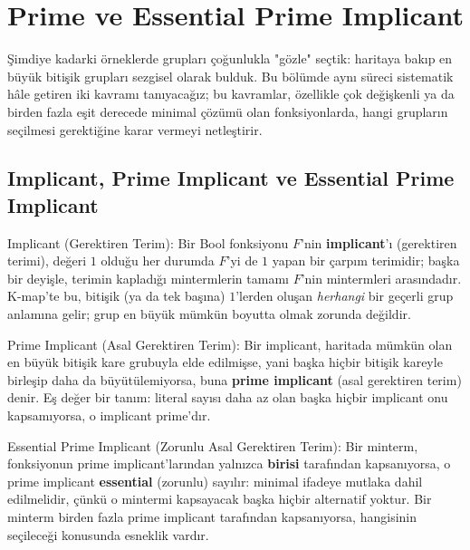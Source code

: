 \section{Prime ve Essential Prime Implicant}\label{sec:kmap-prime-implicant}
Şimdiye kadarki örneklerde grupları çoğunlukla "gözle" seçtik: haritaya bakıp en büyük
bitişik grupları sezgisel olarak bulduk. Bu bölümde aynı süreci sistematik hâle getiren
iki kavramı tanıyacağız; bu kavramlar, özellikle çok değişkenli ya da birden fazla eşit
derecede minimal çözümü olan fonksiyonlarda, hangi grupların seçilmesi gerektiğine karar
vermeyi netleştirir.

\subsection{Implicant, Prime Implicant ve Essential Prime Implicant}\label{sec:prime-implicant-tanimlar}

\begin{tanim}{Implicant (Gerektiren Terim):}
Bir Bool fonksiyonu $F$'nin \textbf{implicant}'ı (gerektiren terimi),
değeri $1$ olduğu her
durumda $F$'yi de $1$ yapan bir çarpım terimidir; başka bir deyişle, terimin kapladığı
mintermlerin tamamı $F$'nin mintermleri arasındadır. K-map'te bu, bitişik (ya da tek
başına) $1$'lerden oluşan \emph{herhangi} bir geçerli grup anlamına gelir; grup en büyük
mümkün boyutta olmak zorunda değildir.
\end{tanim}

\begin{tanim}{Prime Implicant (Asal Gerektiren Terim):}
Bir implicant, haritada mümkün olan en büyük bitişik kare grubuyla elde edilmişse, yani
başka hiçbir bitişik kareyle birleşip daha da büyütülemiyorsa, buna \textbf{prime
implicant} (asal gerektiren terim) denir. Eş değer bir tanım:
literal sayısı daha az olan
başka hiçbir implicant onu kapsamıyorsa, o implicant prime'dır.
\end{tanim}

\begin{tanim}{Essential Prime Implicant (Zorunlu Asal Gerektiren Terim):}
Bir minterm, fonksiyonun prime implicant'larından yalnızca \textbf{birisi} tarafından
kapsanıyorsa, o prime implicant \textbf{essential} (zorunlu) sayılır: minimal ifadeye mutlaka dahil edilmelidir, çünkü o mintermi kapsayacak
başka hiçbir alternatif yoktur. Bir minterm birden fazla prime implicant tarafından
kapsanıyorsa, hangisinin seçileceği konusunda esneklik vardır.
\end{tanim}

